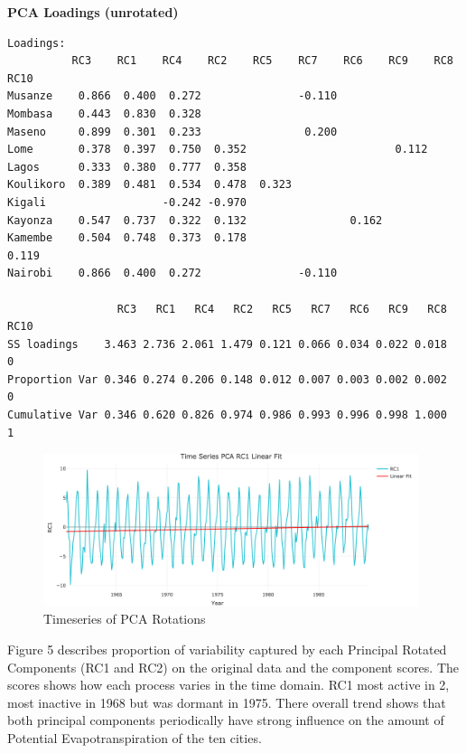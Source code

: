 \documentclass[12pt,a4paper]{article}
\begin{document}
\textbf{PCA Loadings (unrotated)}
\begin{verbatim}
Loadings:
          RC3    RC1    RC4    RC2    RC5    RC7    RC6    RC9    RC8    RC10  
Musanze    0.866  0.400  0.272               -0.110                            
Mombasa    0.443  0.830  0.328                                                 
Maseno     0.899  0.301  0.233                0.200                            
Lome       0.378  0.397  0.750  0.352                       0.112              
Lagos      0.333  0.380  0.777  0.358                                          
Koulikoro  0.389  0.481  0.534  0.478  0.323                                   
Kigali                  -0.242 -0.970                                          
Kayonza    0.547  0.737  0.322  0.132                0.162                     
Kamembe    0.504  0.748  0.373  0.178                              0.119       
Nairobi    0.866  0.400  0.272               -0.110                            

                 RC3   RC1   RC4   RC2   RC5   RC7   RC6   RC9   RC8 RC10
SS loadings    3.463 2.736 2.061 1.479 0.121 0.066 0.034 0.022 0.018    0
Proportion Var 0.346 0.274 0.206 0.148 0.012 0.007 0.003 0.002 0.002    0
Cumulative Var 0.346 0.620 0.826 0.974 0.986 0.993 0.996 0.998 1.000    1
\end{verbatim}
\begin{figure}[!h]
                 \centering
                 \includegraphics[width=0.98\textwidth]{./gaphics/q002_d.png}
\caption{Timeseries of PCA Rotations} 
\label{fig2}
\end{figure}
Figure 5  describes proportion of variability captured by each Principal  Rotated Components (RC1 and RC2) on the
original data and the component scores.  The scores shows how each process varies in the time domain.  RC1 most active in 2, most inactive in 1968 but was dormant in 1975. There overall trend shows that both principal components periodically have strong influence on the amount of Potential Evapotranspiration of the ten cities.
\end{document}
